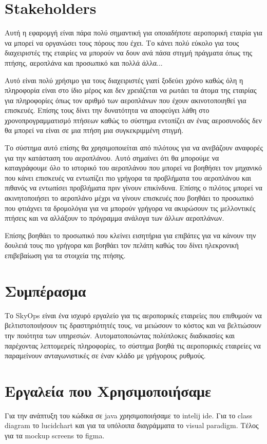 \documentclass{article}
\begin{document}
	\section{Stakeholders}
	Αυτή η εφαρομγή είναι πάρα πολύ σημαντική για οποιαδήποτε αεροπορική εταιρία για να μπορεί να οργανώσει τους
	πόρους που έχει. Το κάνει πολύ εύκολο για τους διαχειριστές της εταιρίες να μπορούν να δουν ανά πάσα στιγμή
	πράγματα όπως της πτήσης, αεροπλάνα και προσωπικό και πολλά άλλα...

	Αυτό είναι πολύ χρήσιμο για τους διαχειριστές γιατί ξοδεύει χρόνο καθώς όλη η πληροφορία είναι στο ίδιο μέρος
	και δεν χρειάζεται να ρωτάει τα άτομα της εταιρίας για πληροφορίες όπως τον αριθμό των αεροπλάνων που έχουν
	ακινοτοποιηθεί για επισκευές. Επίσης τους δίνει την δυνατότητα να αποφεύγει λάθη στο χρονοπρογραμματισμό
	πτήσεων καθώς το σύστημα εντοπίζει αν ένας αεροσυνοδός δεν θα μπορεί να είναι σε μια πτήση μια συγκεκριμμένη στιγμή.

	Το σύστημα αυτό επίσης θα χρησιμοποιείται από πιλότους για να ανεβάζουν αναφορές για την κατάσταση του αεροπλάνου.
	Αυτό σημαίνει ότι θα μπορούμε να καταγράφουμε όλο το ιστορικό του αεροπλάνου που μπορεί να βοηθήσει τον μηχανικό
	που κάνει επισκευές να εντωπίζει πιο γρήγορα τα προβλήματα του αεροπλάνου και πιθανός να εντωπίσει προβλήματα πριν
	γίνουν επικίνδυνα. Επίσης ο πιλότος μπορεί να ακινητοποιήσει το αεροπλάνο μέχρι να γίνουν επισκευές που βοηθάει
	το προσωπικό που φτιάχνει τα δρομολόγια για να μπορούν γρήγορα να ακυρώσουν τις μελλοντικές πτήσεις και να αλλάξουν
	το πρόγραμμα ανάλογα των άλλων αεροπλάνων. 

	Επίσης βοηθάει το προσωπικό που κλείνει εισητήρια για επιβάτες για να κάνουν την δουλειά τους πιο γρήγορα και βοηθάει
	τον πελάτη καθώς του δίνει ηλεκρονική επιβεβαίωση για τα στοιχεία της πτήσης.
	
	\section{Συμπέρασμα}
	Το SkyOps είναι ένα ισχυρό εργαλείο για τις 
	αεροπορικές εταιρείες που επιθυμούν να βελτιστοποιήσουν τις 
	δραστηριότητές τους, να μειώσουν το κόστος και να βελτιώσουν 
	την ποιότητα των υπηρεσιών. Αυτοματοποιώντας πολύπλοκες 
	διαδικασίες και παρέχοντας λεπτομερείς πληροφορίες, το σύστημα 
	βοηθά τις αεροπορικές εταιρείες να παραμείνουν ανταγωνιστικές 
	σε έναν κλάδο με γρήγορους ρυθμούς.

	\section{Εργαλεία που Χρησιμοποιήσαμε}
	Για την ανάπτυξη του κώδικα σε java χρησιμοποιήσαμε το intelij ide. Για το class diagram το lucidchart και για τα υπόλοιπα διαγράμματα το visual paradigm. Τέλος για τα mockup screens το figma.
	
\end{document}
